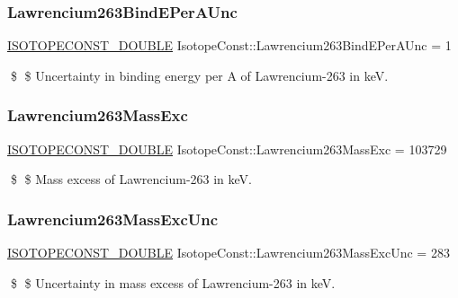 \subsubsection{\texorpdfstring{Lawrencium263\+Bind\+E\+Per\+A\+Unc}{Lawrencium263BindEPerAUnc}}
{\footnotesize\ttfamily \mbox{\hyperlink{group___isotope_const-_macros_ga8f45a7272ce02c0b4c65c44636ed719a}{I\+S\+O\+T\+O\+P\+E\+C\+O\+N\+S\+T\+\_\+\+D\+O\+U\+B\+LE}} Isotope\+Const\+::\+Lawrencium263\+Bind\+E\+Per\+A\+Unc = 1}

\$ \$ Uncertainty in binding energy per A of Lawrencium-\/263 in keV. \mbox{\label{group___isotope_const-_lawrencium-_lr263_ga9df3ee86a649fbf5eb73134ff4b00cc0}} 
\subsubsection{\texorpdfstring{Lawrencium263\+Mass\+Exc}{Lawrencium263MassExc}}
{\footnotesize\ttfamily \mbox{\hyperlink{group___isotope_const-_macros_ga8f45a7272ce02c0b4c65c44636ed719a}{I\+S\+O\+T\+O\+P\+E\+C\+O\+N\+S\+T\+\_\+\+D\+O\+U\+B\+LE}} Isotope\+Const\+::\+Lawrencium263\+Mass\+Exc = 103729}

\$ \$ Mass excess of Lawrencium-\/263 in keV. \mbox{\label{group___isotope_const-_lawrencium-_lr263_ga59bc6be5934903f94f92062012af6394}} 
\subsubsection{\texorpdfstring{Lawrencium263\+Mass\+Exc\+Unc}{Lawrencium263MassExcUnc}}
{\footnotesize\ttfamily \mbox{\hyperlink{group___isotope_const-_macros_ga8f45a7272ce02c0b4c65c44636ed719a}{I\+S\+O\+T\+O\+P\+E\+C\+O\+N\+S\+T\+\_\+\+D\+O\+U\+B\+LE}} Isotope\+Const\+::\+Lawrencium263\+Mass\+Exc\+Unc = 283}

\$ \$ Uncertainty in mass excess of Lawrencium-\/263 in keV. \mbox{\label{group___isotope_const-_lawrencium-_lr263_ga7e3b49530022d4f16aa256f9fe3d3612}} 
